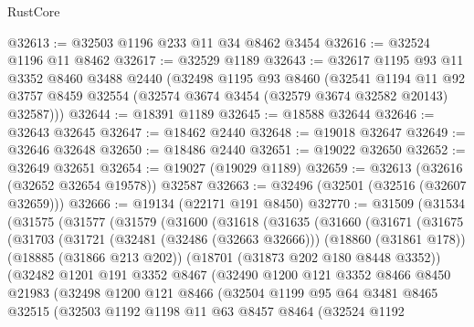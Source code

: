 \begin{lexlean}{RustCore}
\begin{coremodule}
@32613 := @32503 @1196 @233 @11 @34 @8462 @3454
@32616 := @32524 @1196 @11 @8462
@32617 := @32529 @1189
@32643 := @32617
    @1195
    @93
    @11
    @3352
    @8460
    @3488
    @2440
    (@32498
      @1195
      @93
      @8460
      (@32541
        @1194
        @11
        @92
        @3757
        @8459
        @32554
        (@32574 @3674 @3454 (@32579 @3674 @32582 @20143) @32587)))
@32644 := @18391 @1189
@32645 := @18588 @32644
@32646 := @32643 @32645
@32647 := @18462 @2440
@32648 := @19018 @32647
@32649 := @32646 @32648
@32650 := @18486 @2440
@32651 := @19022 @32650
@32652 := @32649 @32651
@32654 := @19027 (@19029 @1189)
@32659 := @32613 (@32616 (@32652 @32654 @19578)) @32587
@32663 := @32496 (@32501 (@32516 (@32607 @32659)))
@32666 := @19134 (@22171 @191 @8450)
@32770 := @31509
    (@31534
      (@31575
        (@31577
          (@31579
            (@31600
              (@31618
                (@31635
                  (@31660
                    (@31671
                      (@31675
                        (@31703
                          (@31721
                            (@32481 (@32486 (@32663 @32666)))
                            (@18860 (@31861 @178))
                            (@18885 (@31866 @213 @202))
                            (@18701 (@31873 @202 @180 @8448 @3352))
                            (@32482
                              @1201
                              @191
                              @3352
                              @8467
                              (@32490
                                @1200
                                @121
                                @3352
                                @8466
                                @8450
                                @21983
                                (@32498
                                  @1200
                                  @121
                                  @8466
                                  (@32504
                                    @1199
                                    @95
                                    @64
                                    @3481
                                    @8465
                                    @32515
                                    (@32503
                                      @1192
                                      @1198
                                      @11
                                      @63
                                      @8457
                                      @8464
                                      (@32524
                                        @1192

\end{coremodule}
\end{lexlean}

